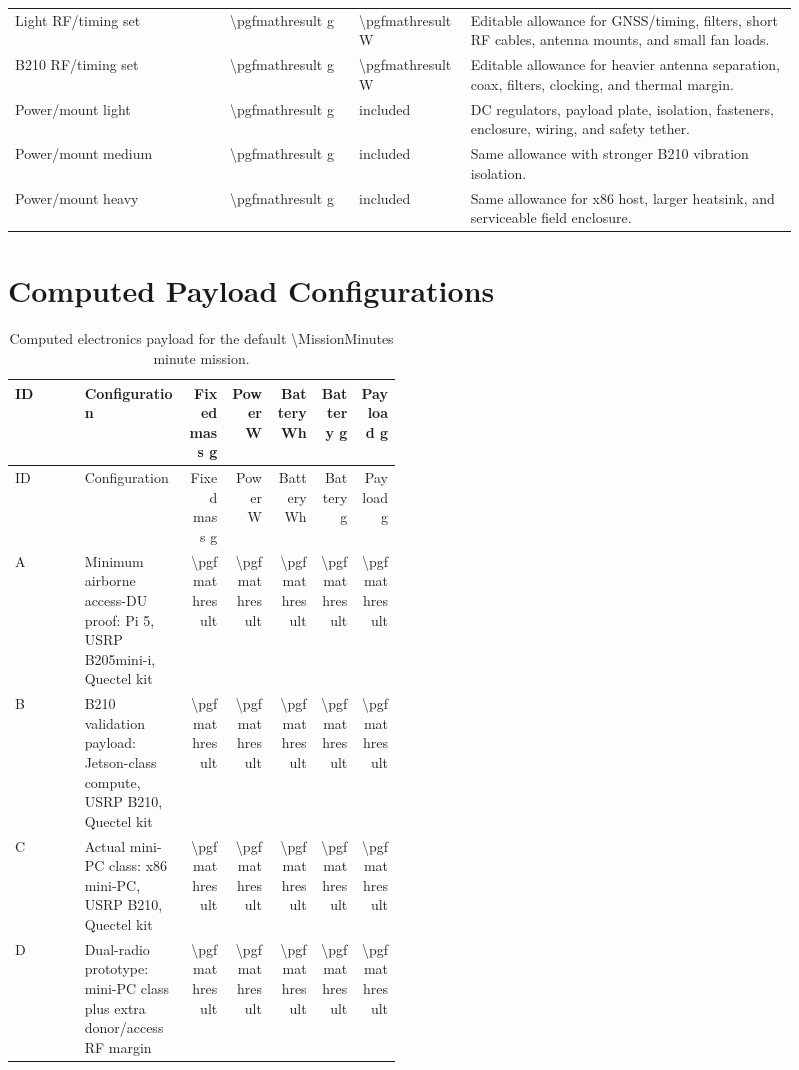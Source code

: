 \documentclass[11pt]{article}
\newcommand{\numg}[1]{\pgfmathparse{#1}\num{\pgfmathresult}}
\newcommand{\numw}[1]{\pgfmathparse{#1}\num{\pgfmathresult}}
\newcommand{\numwh}[1]{\pgfmathparse{#1}\num{\pgfmathresult}}
\begin{document}
\begin{longtable}{p{0.25\linewidth}p{0.15\linewidth}p{0.13\linewidth}p{0.38\linewidth}}
Light RF/timing set & \numg{\MassRfTimingLight} g & \numw{\PowerAuxLight} W &
Editable allowance for GNSS/timing, filters, short RF cables, antenna mounts, and small fan loads. \\
B210 RF/timing set & \numg{\MassRfTimingBTwoTen} g & \numw{\PowerAuxMedium} W &
Editable allowance for heavier antenna separation, coax, filters, clocking, and thermal margin. \\
Power/mount light & \numg{\MassPowerMountLight} g & included & DC regulators, payload plate, isolation, fasteners, enclosure, wiring, and safety tether. \\
Power/mount medium & \numg{\MassPowerMountMedium} g & included & Same allowance with stronger B210 vibration isolation. \\
Power/mount heavy & \numg{\MassPowerMountHeavy} g & included & Same allowance for x86 host, larger heatsink, and serviceable field enclosure. \\
\bottomrule
\end{longtable}

\section*{Computed Payload Configurations}

\begin{longtable}{p{0.18\linewidth}p{0.27\linewidth}rrrrr}
\caption{Computed electronics payload for the default \num{\MissionMinutes} minute mission.}\\
\toprule
ID & Configuration & Fixed mass g & Power W & Battery Wh & Battery g & Payload g \\
\midrule
\endfirsthead
\toprule
ID & Configuration & Fixed mass g & Power W & Battery Wh & Battery g & Payload g \\
\midrule
\endhead
A & Minimum airborne access-DU proof: Pi 5, USRP B205mini-i, Quectel kit & \numg{\AStaticG} & \numw{\APowerW} & \numwh{\ABatteryWh} & \numg{\ABatteryG} & \numg{\ATotalG} \\
B & B210 validation payload: Jetson-class compute, USRP B210, Quectel kit & \numg{\BStaticG} & \numw{\BPowerW} & \numwh{\BBatteryWh} & \numg{\BBatteryG} & \numg{\BTotalG} \\
C & Actual mini-PC class: x86 mini-PC, USRP B210, Quectel kit & \numg{\CStaticG} & \numw{\CPowerW} & \numwh{\CBatteryWh} & \numg{\CBatteryG} & \numg{\CTotalG} \\
D & Dual-radio prototype: mini-PC class plus extra donor/access RF margin & \numg{\DStaticG} & \numw{\DPowerW} & \numwh{\DBatteryWh} & \numg{\DBatteryG} & \numg{\DTotalG} \\
\bottomrule
\end{longtable}
\end{document}
